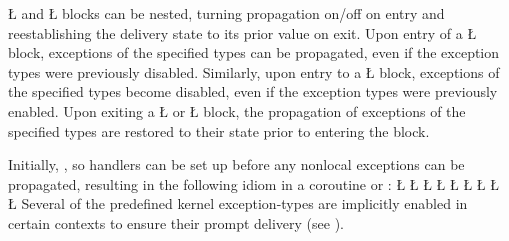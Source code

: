 \documentclass[openright,twoside]{report}
\begin{document}
\LGinlinetrue\LGbegin\lgrinde\L{}\endlgrinde\LGend{} and \LGinlinetrue\LGbegin\lgrinde\L{}\endlgrinde\LGend{} blocks can be nested, turning propagation on/off on entry and reestablishing the delivery state to its prior value on exit.
Upon entry of a \LGinlinetrue\LGbegin\lgrinde\L{}\endlgrinde\LGend{} block, exceptions of the specified types can be propagated, even if the exception types were previously disabled.
Similarly, upon entry to a \LGinlinetrue\LGbegin\lgrinde\L{}\endlgrinde\LGend{} block, exceptions of the specified types become disabled, even if the exception types were previously enabled.
Upon exiting a \LGinlinetrue\LGbegin\lgrinde\L{}\endlgrinde\LGend{} or \LGinlinetrue\LGbegin\lgrinde\L{}\endlgrinde\LGend{} block, the propagation of exceptions of the specified types are restored to their state prior to entering the block.

Initially, , so handlers can be set up before any nonlocal exceptions can be propagated, resulting in the following \uC idiom in a coroutine or :
\LGinlinefalse\LGbegin\lgrinde
\L{}
\L{\LB{}}
\CE{}\L{\LB{}}
\CE{}\L{\LB{}}
\CE{}\L{\LB{}}
\CE{}\L{\LB{}}
\CE{}\L{\LB{}}
\CE{}\L{\LB{}}
\CE{}\L{\LB{\}}}
\endlgrinde\LGend
Several of the predefined kernel exception-types are implicitly enabled in certain contexts to ensure their prompt delivery (see ).
\end{document}
